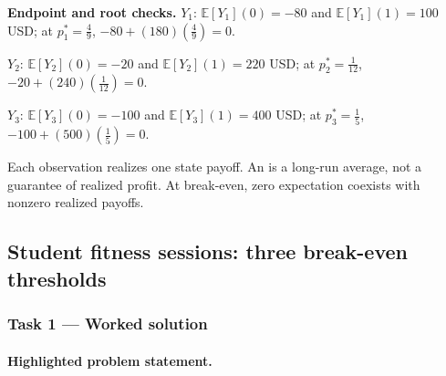 \textbf{Endpoint and root checks.} $Y_1$: $\mathbb E[Y_1](0)=-80$ and $\mathbb E[Y_1](1)=100$ USD; at $p_1^*=\frac{4}{9}$, $-80+(180)(\frac{4}{9})=0$.

$Y_2$: $\mathbb E[Y_2](0)=-20$ and $\mathbb E[Y_2](1)=220$ USD; at $p_2^*=\frac{1}{12}$, $-20+(240)(\frac{1}{12})=0$.

$Y_3$: $\mathbb E[Y_3](0)=-100$ and $\mathbb E[Y_3](1)=400$ USD; at $p_3^*=\frac{1}{5}$, $-100+(500)(\frac{1}{5})=0$.

Each observation realizes one state payoff. An  is a long-run average,
not a guarantee of realized profit. At break-even, zero expectation coexists with nonzero realized payoffs.
\CThreeExpectRestaurant
{}
\clearpage
\subsection{Student fitness sessions: three break-even thresholds}\label{prob:c3-agriculture}
\CThreePlain{\CThreeStatementAgriculture}
\subsubsection*{Task 1 --- Worked solution}\label{sol:c3-agriculture-model}
\paragraph{Highlighted problem statement.}
\CThreeStatementAgriculture
\CThreeTaskOne

